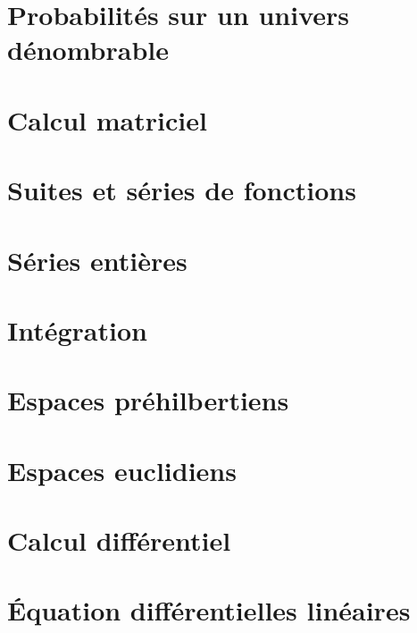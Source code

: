 \documentclass[12pt]{article}
\theoremstyle{remark}
\numberwithin{equation}{section}
\begin{document}
\section{Probabilités sur un univers dénombrable}
\section{Calcul matriciel}




\section{Suites et séries de fonctions}
\section{Séries entières}
\section{Intégration}
\section{Espaces préhilbertiens}
\section{Espaces euclidiens}
\section{Calcul différentiel}
\section{\'Equation différentielles linéaires}
\end{document}
